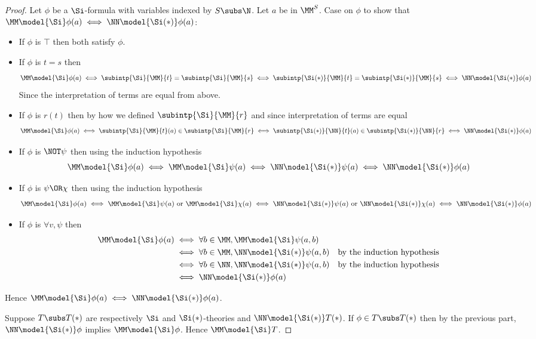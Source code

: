 \begin{proof}
    Let $\phi$ be a $\Si$-formula with variables
    indexed by $S \subs \N$.
    Let $a$ be in $\MM^S$.
    Case on $\phi$ to show that 
    $\MM \model{\Si} \phi(a) \iff \NN \model{\Si(*)} \phi(a)$:
    \begin{itemize}
        \item {If $\phi$ is $\top$ then both satisfy $\phi$.}
        \item If $\phi$ is $t = s$ then
        \[
            \MM \model{\Si} \phi(a) \iff \subintp{\Si}{\MM}{t} = 
            \subintp{\Si}{\MM}{s}
            \iff \subintp{\Si(*)}{\MM}{t} = \subintp{\Si(*)}{\MM}{s} 
            \iff \NN \model{\Si(*)} \phi(a)
        \]
            Since the interpretation 
            of terms are equal from above.
        \item If $\phi$ is $r(t)$ then by how we defined 
        $\subintp{\Si}{\MM}{r}$ and since interpretation 
        of terms are equal
        \[
            \MM \model{\Si} \phi(a) \iff \subintp{\Si}{\MM}{t}(a) 
            \in \subintp{\Si}{\MM}{r}
            \iff \subintp{\Si(*)}{\NN}{t}(a) \in 
            \subintp{\Si(*)}{\NN}{r}
            \iff \NN \model{\Si(*)} \phi(a) 
        \]
        \item If $\phi$ is $\NOT \psi$ then using the induction hypothesis
            \[
                \MM \model{\Si} \phi(a) \iff \MM \nodel{\Si} \psi(a)
                \iff \NN \nodel{\Si(*)} \psi(a)
                \iff \NN \model{\Si(*)} \phi(a) 
            \]
        \item If $\phi$ is $\psi \OR \chi$ then using the induction hypothesis
            \begin{align*}
                \MM \model{\Si} \phi(a) \iff \MM \model{\Si} \psi(a) 
                \text{ or } \MM \model{\Si} \chi(a)
                \iff \NN \model{\Si(*)} \psi(a) \text{ or } 
                \NN \model{\Si(*)} \chi(a)
                \iff \NN \model{\Si(*)} \phi(a) 
            \end{align*}
        \item If $\phi$ is $\forall v, \psi$ then
        \begin{align*}
            \MM \model{\Si} \phi(a) &\iff \forall b \in {\MM}, 
            \MM \model{\Si} \psi(a,b)\\
                &\iff \forall b \in {\MM}, \NN \model{\Si(*)} \psi(a,b)
                & \text{by the induction hypothesis}\\
                &\iff \forall b \in {\NN}, \NN \model{\Si(*)} \psi(a,b)
                & \text{by the induction hypothesis}\\
                & \iff \NN \model{\Si(*)} \phi(a) 
        \end{align*}
    \end{itemize}
    Hence $\MM \model{\Si} \phi(a) \iff \NN \model{\Si(*)} \phi(a)$.

    Suppose $T \subs T(*)$ are respectively $\Si$ and $\Si(*)$-theories and 
    $\NN \model{\Si(*)} T(*)$.
    If $\phi \in T \subs T(*)$ then by the previous part, 
    $\NN \model{\Si(*)} \phi$ implies $\MM \model{\Si} \phi$.
    Hence $\MM \model{\Si} T$.
\end{proof}

